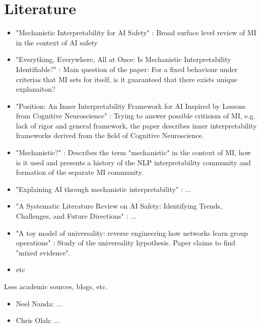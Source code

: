 \documentclass[12pt, a4paper]{article}
\begin{document}
\section*{Literature}
\begin{itemize}
    \item "Mechanistic Interpretability for AI Safety" \cite{bereska2024}: Broad surface level review of MI in the context of AI safety
    \item "Everything, Everywhere, All at Once: Is Mechanistic Interpretability Identifiable?" \cite{meloux2025}: Main question of the paper: For a fixed behaviour under criterias that MI sets for itself, is it guaranteed that there exists unique explanaiton?
    \item "Position: An Inner Interpretability Framework for AI Inspired by Lessons from Cognitive Neuroscience" \cite{vilas2024}: Trying to answer possible critisism of MI, e.g. lack of rigor and general framework, the paper describes inner interpretability frameworks derived from the field of Cognitive Neuroscience.
    \item "Mechanistic?" \cite{wiegreffe2024}: Describes the term "mechanistic" in the context of MI, how is it used and presents a history of the NLP interpretability community and formation of the separate MI community.
    \item "Explaining AI through mechanistic interpretability" \cite{kästner2024}: ...
    \item "A Systematic Literature Review on AI Safety: Identifying Trends, Challenges, and Future Directions" \cite{salhab2024}: ...
    \item "A toy model of universality: reverse engineering how networks learn group operations" \cite{chughtai2023}: Study of the universality hypothesis. Paper claims to find "mixed evidence".
    \item etc
\end{itemize}

Less academic sources, blogs, etc.
\begin{itemize}
    \item Neel Nanda: ...
    \item Chris Olah: ...
\end{itemize}


\printbibliography
\end{document}
